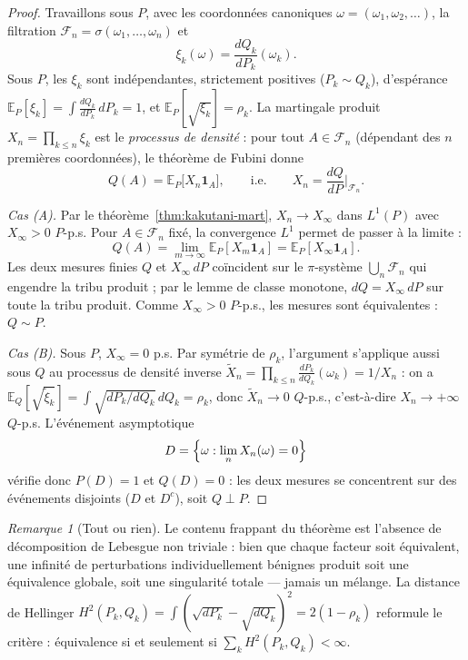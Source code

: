 \documentclass[11pt,a4paper]{article}
\theoremstyle{plain}
\theoremstyle{definition}
\theoremstyle{remark}
\newtheorem{remark}[theorem]{Remarque}
\newcommand{\E}{\mathbb{E}}
\newcommand{\F}{\mathcal{F}}
\newcommand{\ind}{\mathbf{1}}
\begin{document}
\begin{proof}
Travaillons sous $P$, avec les coordonnées canoniques
$\omega = (\omega_1, \omega_2, \dots)$, la filtration
$\F_n = \sigma(\omega_1, \dots, \omega_n)$ et
\[
\xi_k(\omega) = \frac{dQ_k}{dP_k}(\omega_k).
\]
Sous $P$, les $\xi_k$ sont indépendantes, strictement positives
($P_k \sim Q_k$), d'espérance $\E_P[\xi_k] = \int \frac{dQ_k}{dP_k}\,dP_k = 1$,
et $\E_P[\sqrt{\xi_k}] = \rho_k$. La martingale produit
$X_n = \prod_{k\le n}\xi_k$ est le \emph{processus de densité} : pour tout
$A \in \F_n$ (dépendant des $n$ premières coordonnées), le théorème de Fubini
donne
\[
Q(A) = \E_P\bigl[X_n \ind_A\bigr],
\qquad \text{i.e.} \qquad
X_n = \frac{dQ}{dP}\bigg|_{\F_n}.
\]

\emph{Cas (A).} Par le théorème~\ref{thm:kakutani-mart}, $X_n \to X_\infty$
dans $L^1(P)$ avec $X_\infty > 0$ $P$-p.s. Pour $A \in \F_n$ fixé, la
convergence $L^1$ permet de passer à la limite :
\[
Q(A) = \lim_{m\to\infty}\E_P[X_m \ind_A] = \E_P[X_\infty \ind_A].
\]
Les deux mesures finies $Q$ et $X_\infty\,dP$ coïncident sur le $\pi$-système
$\bigcup_n \F_n$ qui engendre la tribu produit ; par le lemme de classe
monotone, $dQ = X_\infty\, dP$ sur toute la tribu produit. Comme $X_\infty > 0$
$P$-p.s., les mesures sont équivalentes : $Q \sim P$.

\emph{Cas (B).} Sous $P$, $X_\infty = 0$ p.s. Par symétrie de $\rho_k$,
l'argument s'applique aussi sous $Q$ au processus de densité inverse
$\widetilde{X}_n = \prod_{k \le n} \frac{dP_k}{dQ_k}(\omega_k) = 1/X_n$ : on a
$\E_Q[\sqrt{\widetilde\xi_k}] = \int\sqrt{dP_k/dQ_k}\,dQ_k = \rho_k$, donc
$\widetilde{X}_n \to 0$ $Q$-p.s., c'est-à-dire $X_n \to +\infty$ $Q$-p.s.
L'événement asymptotique
\[
D = \Bigl\{\omega : \lim_n X_n(\omega) = 0\Bigr\}
\]
vérifie donc $P(D) = 1$ et $Q(D) = 0$ : les deux mesures se concentrent sur des
événements disjoints ($D$ et $D^c$), soit $Q \perp P$.
\end{proof}

\begin{remark}[Tout ou rien]
Le contenu frappant du théorème est l'absence de décomposition de Lebesgue non
triviale : bien que chaque facteur soit équivalent, une infinité de
perturbations individuellement bénignes produit soit une équivalence globale,
soit une singularité totale --- jamais un mélange. La distance de Hellinger
$H^2(P_k, Q_k) = \int(\sqrt{dP_k} - \sqrt{dQ_k})^2 = 2(1 - \rho_k)$ reformule
le critère : équivalence si et seulement si $\sum_k H^2(P_k, Q_k) < \infty$.
\end{remark}
\end{document}
